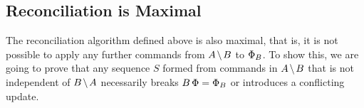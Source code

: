 
\subsection{Reconciliation is Maximal}




The reconciliation algorithm defined above is also maximal, that is,
it is not possible to apply any further commands from $\ambnp$ to $\Phi_B$.
To show this, we are going to prove that any sequence $S$ formed from commands
in $\ambnp$ that is not independent of $\bmanp$ necessarily breaks $B\,\Phi=\Phi_B$
or introduces a conflicting update.

